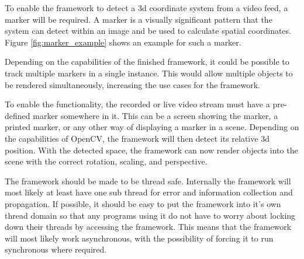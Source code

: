 To enable the framework to detect a 3d coordinate system from a video feed, a marker will be required.
A marker is a visually significant pattern that the system can detect within an image and be used to calculate spatial coordinates. Figure \ref{fig:marker_example} shows an example for such a marker.

Depending on the capabilities of the finished framework, it could be possible to track multiple markers in a single instance.
This would allow multiple objects to be rendered simultaneously, increasing the use cases for the framework.

To enable the functionality, the recorded or live video stream must have a pre-defined marker somewhere in it.
This can be a screen showing the marker, a printed marker, or any other way of displaying a marker in a scene.
Depending on the capabilities of OpenCV, the framework will then detect its relative 3d position.
With the detected space, the framework can now render objects into the scene with the correct rotation, scaling, and perspective.

The framework should be made to be thread safe.
Internally the framework will most likely at least have one sub thread for error and information collection and propagation.
If possible, it should be easy to put the framework into it's own thread domain so that any programs using it do not have to worry about locking down their threads by accessing the framework.
This means that the framework will most likely work asynchronous, with the possibility of forcing it to run synchronous where required.

